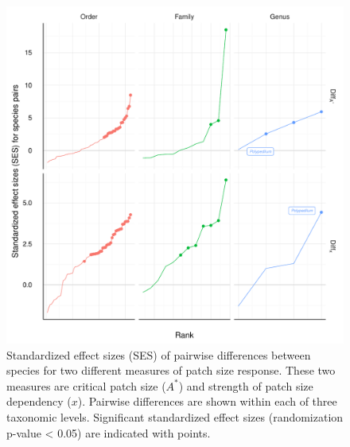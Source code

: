 \begin{figure}[htbp]
\centering
\includegraphics[width=5.5in]{figures/ses_rank.pdf}
\caption{Standardized effect sizes (SES) of pairwise differences
between species for two different measures of patch size response.
These two measures are critical patch size (\(A^{*}\)) and strength of
patch size dependency (\(x\)). Pairwise differences are shown within
each of three taxonomic levels. Significant standardized effect sizes
(randomization p-value \textless{} 0.05) are indicated with points.}
\end{figure}
